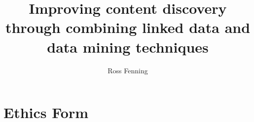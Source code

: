 \documentclass[10pt,a4paper]{report}
\title{Improving content discovery through combining linked data and data mining techniques}
\author{Ross Fenning}
\begin{document}
\maketitle
\tableofcontents












\appendix

\chapter{Ethics Form}

\end{document}
